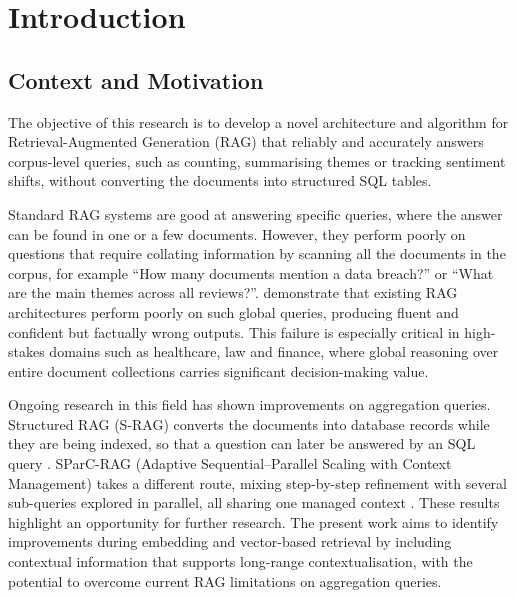 \documentclass[11pt,letterpaper,oneside]{report}
\begin{document}
\clearpage
{}

\chapter{Introduction}
\label{ch:intro}

\section{Context and Motivation}
\label{sec:context}
The objective of this research is to develop a novel architecture and
algorithm for Retrieval-Augmented Generation (RAG) that reliably and
accurately answers corpus-level queries, such as counting, summarising themes
or tracking sentiment shifts, without converting the documents into
structured SQL tables.

Standard RAG systems are good at answering specific queries, where the answer
can be found in one or a few documents. However, they perform poorly on
questions that require collating information by scanning all the documents in
the corpus, for example ``How many documents mention a data breach?'' or
``What are the main themes across all reviews?''. \citet{luo2025globalrag}
demonstrate that existing RAG architectures perform poorly on such global
queries, producing fluent and confident but factually wrong outputs. This
failure is especially critical in high-stakes domains such as healthcare, law
and finance, where global reasoning over entire document collections carries
significant decision-making value.

Ongoing research in this field has shown improvements on aggregation queries.
Structured RAG (S-RAG) converts the documents into database records while
they are being indexed, so that a question can later be answered by an SQL
query \citep{koshorek2025srag}. SParC-RAG (Adaptive Sequential--Parallel
Scaling with Context Management) takes a different route, mixing step-by-step
refinement with several sub-queries explored in parallel, all sharing one
managed context \citep{yang2026sparcrag}. These results highlight an opportunity for further
research. The present work aims to identify improvements during embedding and
vector-based retrieval by including contextual information that supports
long-range contextualisation, with the potential to overcome current RAG
limitations on aggregation queries.
\end{document}
